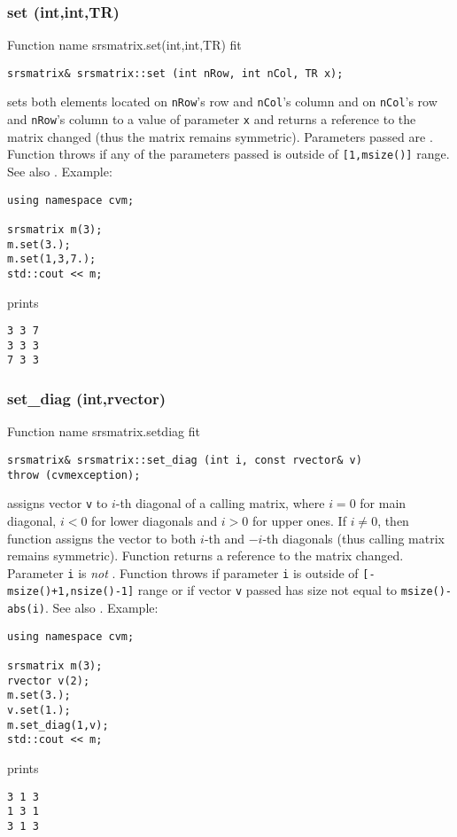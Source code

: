 \subsubsection{set (int,int,TR)}
Function%
\pdfdest name {srsmatrix.set(int,int,TR)} fit
\begin{verbatim}
srsmatrix& srsmatrix::set (int nRow, int nCol, TR x);
\end{verbatim}
sets both elements located on \verb"nRow"'s row
and \verb"nCol"'s column and on 
\verb"nCol"'s row
and \verb"nRow"'s column to a value of
parameter \verb"x" and returns a reference to
the matrix changed (thus the matrix remains symmetric).
Parameters passed 
are \Based.
Function throws 
if any of the parameters passed
is outside of \verb"[1,msize()]" range.
See also .
Example:
\begin{Verbatim}
using namespace cvm;

srsmatrix m(3);
m.set(3.);
m.set(1,3,7.);
std::cout << m;
\end{Verbatim}
prints
\begin{Verbatim}
3 3 7
3 3 3
7 3 3
\end{Verbatim}
\newpage



\subsubsection{set\_diag (int,rvector)}
Function%
\pdfdest name {srsmatrix.setdiag} fit
\begin{verbatim}
srsmatrix& srsmatrix::set_diag (int i, const rvector& v)
throw (cvmexception);
\end{verbatim}
assigns vector \verb"v"
to \hbox{$i$-th} diagonal of a calling matrix,
where $i=0$ for main diagonal, $i<0$ for lower diagonals 
and $i>0$ for upper ones.
If $i\not=0$, then  function assigns the vector
to both $i$-th and $-i$-th diagonals
(thus calling matrix remains symmetric).
Function returns a reference to the matrix changed.
Parameter \verb"i" is \emph{not} \Based.
Function throws 
if parameter \verb"i" is outside of 
\verb"[-msize()+1,nsize()-1]" range or if
vector \verb"v" passed has  size not equal to
\verb"msize()-abs(i)".
See also .
Example:
\begin{Verbatim}
using namespace cvm;

srsmatrix m(3);
rvector v(2);
m.set(3.);
v.set(1.);
m.set_diag(1,v);
std::cout << m;
\end{Verbatim}
prints
\begin{Verbatim}
3 1 3
1 3 1
3 1 3
\end{Verbatim}
\newpage



